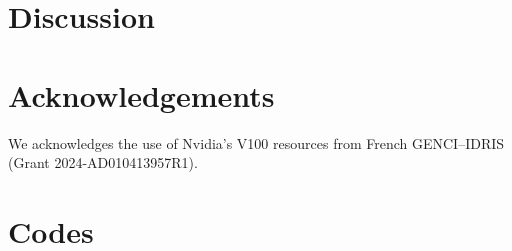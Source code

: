 \documentclass[11pt]{amsart}
\begin{document}
\section{Discussion}


\section*{Acknowledgements}
We acknowledges the use of  Nvidia’s V100 resources from French GENCI–IDRIS (Grant 2024-AD010413957R1).

\section*{Codes}


\end{document}
